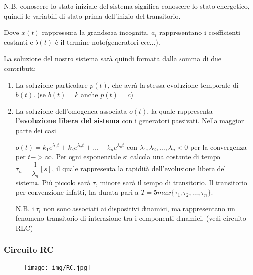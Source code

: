 \documentclass{article}
\begin{document}
\noindent N.B. conoscere lo stato iniziale del sistema significa conoscere lo stato energetico, quindi le variabili di stato prima dell'inizio
del transitorio.

\medskip
\noindent{}
\medskip

\noindent Dove $x(t)$ rappresenta la grandezza incognita, $a_i$ rappresentano i coefficienti costanti e $b(t)$ è il termine noto(generatori ecc...).

\noindent La soluzione del nostro sistema sarà quindi formata dalla somma di due contributi:
\begin{enumerate}
    \item La soluzione particolare $p(t)$, che avrà la stessa evoluzione temporale di $b(t)$. (se $b(t)=k$ anche $p(t)=c$)
    \item La soluzione dell'omogenea associata $o(t)$, la quale rappresenta \textbf{l'evoluzione libera del sistema} con i generatori 
    passivati. Nella maggior parte dei casi 
    
    \noindent $o(t)=k_1e^{\lambda_1t}+k_2e^{\lambda_2t}+\dots+k_ne^{\lambda_nt}$ con $\lambda_1,\lambda_2,\dots,\lambda_n < 0$ per la convergenza
    per $t->\infty$. Per ogni esponenziale si calcola una costante di tempo $\tau_n=\dfrac{1}{\lambda_n}[s]$, il quale rappresenta la rapidità
    dell'evoluzione libera del sistema. Più piccolo sarà $\tau$, minore sarà il tempo di transitorio. Il transitorio per convenzione infatti,
    ha durata pari a $T=5max\{\tau_1,\tau_2,\dots,\tau_n\}$. 

    \noindent N.B. i $\tau_i$ non sono associati ai dispositivi dinamici, ma rappresentano un fenomeno transitorio di interazione tra i componenti 
    dinamici. (vedi circuito RLC)
\end{enumerate}

\pagebreak

\subsubsection{Circuito RC}

\begin{figure}[h!]
    \begin{center}
        \texttt{[image: img/RC.jpg]}
    \end{center}
\end{figure}
\end{document}
